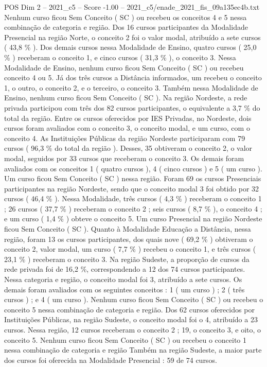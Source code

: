 \begin{textsample}{POS Dim 2 – 2021\_c5 – Score -1.00 – 2021\_c5/enade\_2021\_fis\_09a135ec4b.txt}
Nenhum curso ficou Sem Conceito ( SC ) ou recebeu os conceitos 4 e 5 nessa combinação de categoria e região.
Dos 16 cursos participantes da Modalidade Presencial na região Norte, o conceito 2 foi o valor modal, atribuído a sete cursos ( 43,8 \% ).
Dos demais cursos nessa Modalidade de Ensino, quatro cursos ( 25,0 \% ) receberam o conceito 1, e cinco cursos ( 31,3 \% ), o conceito 3.
Nessa Modalidade de Ensino, nenhum curso ficou Sem Conceito ( SC ) ou recebeu conceito 4 ou 5.
Já dos três cursos a Distância informados, um recebeu o conceito 1, o outro, o conceito 2, e o terceiro, o conceito 3.
Também nessa Modalidade de Ensino, nenhum curso ficou Sem Conceito ( SC ).
Na região Nordeste, a rede privada participou com três dos 82 cursos participantes, o equivalente a 3,7 \% do total da região.
Entre os cursos oferecidos por IES Privadas, no Nordeste, dois cursos foram avaliados com o conceito 3, o conceito modal, e um curso, com o conceito 4.
As Instituições Públicas da região Nordeste participaram com 79 cursos ( 96,3 \% do total da região ).
Desses, 35 obtiveram o conceito 2, o valor modal, seguidos por 33 cursos que receberam o conceito 3.
Os demais foram avaliados com os conceitos 1 ( quatro cursos ), 4 ( cinco cursos ) e 5 ( um curso ).
Um curso ficou Sem Conceito ( SC ) nessa região.
Foram 69 os cursos Presenciais participantes na região Nordeste, sendo que o conceito modal 3 foi obtido por 32 cursos ( 46,4 \% ).
Nessa Modalidade, três cursos ( 4,3 \% ) receberam o conceito 1 ; 26 cursos ( 37,7 \% ) receberam o conceito 2 ; seis cursos ( 8,7 \% ), o conceito 4 ; e um curso ( 1,4 \% ) obteve o conceito 5.
Um curso Presencial na região Nordeste ficou Sem Conceito ( SC ).
Quanto à Modalidade Educação a Distância, nessa região, foram 13 os cursos participantes, dos quais nove ( 69,2 \% ) obtiveram o conceito 2, valor modal, um curso ( 7,7 \% ) recebeu o conceito 1, e três cursos ( 23,1 \% ) receberam o conceito 3.
Na região Sudeste, a proporção de cursos da rede privada foi de 16,2 \%, correspondendo a 12 dos 74 cursos participantes.
Nessa categoria e região, o conceito modal foi 3, atribuído a sete cursos.
Os demais foram avaliados com os seguintes conceitos : 1 ( um curso ) ; 2 ( três cursos ) ; e 4 ( um curso ).
Nenhum curso ficou Sem Conceito ( SC ) ou recebeu o conceito 5 nessa combinação de categoria e região.
Dos 62 cursos oferecidos por Instituições Públicas, na região Sudeste, o conceito modal foi o 4, atribuído a 23 cursos.
Nessa região, 12 cursos receberam o conceito 2 ; 19, o conceito 3, e oito, o conceito 5.
Nenhum curso ficou Sem Conceito ( SC ) ou recebeu o conceito 1 nessa combinação de categoria e região Também na região Sudeste, a maior parte dos cursos foi oferecida na Modalidade Presencial : 59 de 74 cursos.

\end{textsample}
